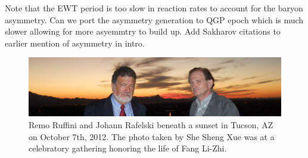 \documentclass[universe,article,submit,moreauthors,pdftex,a4paper]{Definitions/mdpi}
\newcommand*{\xred}{\color{red}}
\begin{document}
{\xred Note that the EWT period is too slow in reaction rates to account for the baryon asymmetry. Can we port the asymmetry generation to QGP epoch which is much slower allowing for more asyemmtry to build up. \cite{Yang:2020nne} Add Sakharov citations to earlier mention of asymmetry in intro.}


\begin{figure}[H]
\centering
\includegraphics[width=\textwidth]{./plots/remo_sunset}
\caption{Remo Ruffini and Johann Rafelski beneath a sunset in Tucson, AZ on October 7th, 2012. The photo taken by She Sheng Xue was at a celebratory gathering honoring the life of Fang Li-Zhi.}
\label{remo_sunset}
\end{figure}





\end{document}
